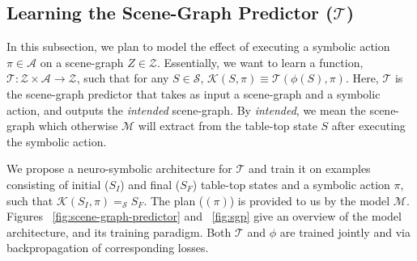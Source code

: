 \subsection{Learning the Scene-Graph Predictor ($\mathcal{T}$)}
\label{subsec:sgp}
In this subsection, we plan to model the effect of executing a symbolic action $\pi \in \mathcal{A}$ on a scene-graph $Z \in \mathcal{Z}$. Essentially, we want to learn a function, $\mathcal{T}: \mathcal{Z} \times \mathcal{A} \rightarrow \mathcal{Z}$, such that for any $S \in \mathcal{S}$, $\mathcal{K}(S, \pi) \equiv \mathcal{T}(\phi(S), \pi)$. Here, $\mathcal{T}$ is the scene-graph predictor that takes as input a scene-graph and a symbolic action, and outputs the \textit{intended} scene-graph. By \textit{intended}, we mean the scene-graph which otherwise $\mathcal{M}$ will extract from the table-top state $S$ after executing the symbolic action. 

We propose a neuro-symbolic architecture for $\mathcal{T}$ and train it on examples consisting of initial ($S_I$) and final ($S_F$) table-top states and a symbolic action $\pi$, such that $\mathcal{K}(S_I, \pi) =_\mathcal{S} S_F$. The plan ($(\pi)$) is provided to us by the model $\mathcal{M}$. Figures ~\ref{fig:scene-graph-predictor} and ~\ref{fig:sgp} give an overview of the model architecture, and its training paradigm. Both $\mathcal{T}$ and $\phi$ are trained jointly and via backpropagation of corresponding losses.

